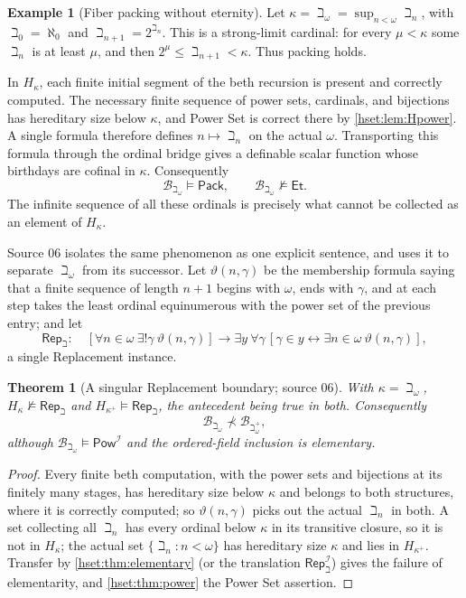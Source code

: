\documentclass[11pt,letterpaper]{article}
\newtheorem{theorem}{Theorem}[section]
\theoremstyle{definition}
\newtheorem{example}[example]{Example}\aliascntresetthe{example}
\theoremstyle{remark}
\newcommand{\B}{\mathcal B}
\newcommand{\I}{\mathcal I}
\newcommand{\Et}{\mathsf{Et}}
\newcommand{\Pack}{\mathsf{Pack}}
\newcommand{\PowI}{\mathsf{Pow}^{\I}}
\newcommand{\RepB}{\mathsf{Rep}_{\beth}}
\begin{document}
\begin{example}[Fiber packing without eternity]
\label{hset:ex:bethomega}
Let $\kappa=\beth_\omega=\sup_{n<\omega}\beth_n$, with
$\beth_0=\aleph_0$ and $\beth_{n+1}=2^{\beth_n}$. This is a strong-limit
cardinal: for every $\mu<\kappa$ some $\beth_n$ is at least $\mu$, and then
$2^\mu\le\beth_{n+1}<\kappa$. Thus packing holds.

In $H_\kappa$, each finite initial segment of the beth recursion is present
and correctly computed. The necessary finite sequence of power sets,
cardinals, and bijections has hereditary size below $\kappa$, and Power Set
is correct there by \cref{hset:lem:Hpower}. A single formula therefore defines
$n\mapsto\beth_n$ on the actual $\omega$. Transporting this formula through
the ordinal bridge gives a definable scalar function whose birthdays are
cofinal in $\kappa$. Consequently
\[
 \B_{\beth_\omega}\models\Pack,
 \qquad\B_{\beth_\omega}\not\models\Et.
\]
The infinite sequence of all these ordinals is precisely what cannot be
collected as an element of $H_\kappa$.
\end{example}

Source 06 isolates the same phenomenon as one explicit sentence, and uses it to
separate $\beth_\omega$ from its successor. Let $\vartheta(n,\gamma)$ be the
membership formula saying that a finite sequence of length $n+1$ begins with
$\omega$, ends with $\gamma$, and at each step takes the least ordinal
equinumerous with the power set of the previous entry; and let
\[
 \RepB:\quad
 [\forall n\in\omega\ \exists!\gamma\ \vartheta(n,\gamma)]
 \longrightarrow
 \exists y\ \forall\gamma\,[\gamma\in y\leftrightarrow
 \exists n\in\omega\ \vartheta(n,\gamma)],
\]
a single Replacement instance.

\begin{theorem}[A singular Replacement boundary; source 06]\label{hset:thm:beth}
With $\kappa=\beth_\omega$, $H_\kappa\not\models\RepB$ and
$H_{\kappa^+}\models\RepB$, the antecedent being true in both. Consequently
\[
 \B_{\beth_\omega}\not\prec\B_{\beth_\omega^+},
\]
although $\B_{\beth_\omega}\models\PowI$ and the ordered-field inclusion is
elementary.
\end{theorem}
\begin{proof}
Every finite beth computation, with the power sets and bijections at its
finitely many stages, has hereditary size below $\kappa$ and belongs to both
structures, where it is correctly computed; so $\vartheta(n,\gamma)$ picks out
the actual $\beth_n$ in both. A set collecting all $\beth_n$ has every ordinal
below $\kappa$ in its transitive closure, so it is not in $H_\kappa$; the actual
set $\{\beth_n:n<\omega\}$ has hereditary size $\kappa$ and lies in
$H_{\kappa^+}$. Transfer by \cref{hset:thm:elementary} (or the translation
$\RepB^\I$) gives the failure of elementarity, and \cref{hset:thm:power} the
Power Set assertion.
\end{proof}
\end{document}

